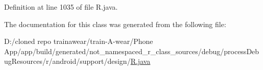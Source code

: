 Definition at line 1035 of file R.\+java.



The documentation for this class was generated from the following file\+:\begin{DoxyCompactItemize}
\item 
D\+:/cloned repo trainawear/train-\/\+A-\/wear/\+Phone App/app/build/generated/not\+\_\+namespaced\+\_\+r\+\_\+class\+\_\+sources/debug/process\+Debug\+Resources/r/android/support/design/\mbox{\hyperlink{process_debug_resources_2r_2android_2support_2design_2_r_8java}{R.\+java}}\end{DoxyCompactItemize}
